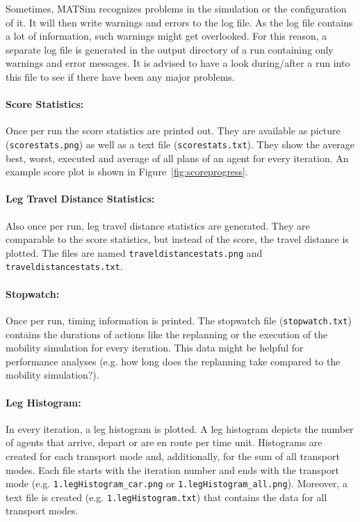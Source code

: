 Sometimes, MATSim recognizes problems in the simulation or the configuration of it. It will then write warnings and errors to the log file. As the log file contains a lot of information, such warnings might get overlooked. For this reason, a separate log file is generated in the output directory of a run containing only warnings and error messages. It is advised to have a look during/after a run into this file to see if there have been any major problems.

\paragraph{Score Statistics:}
Once per run the score statistics are printed out. They are available as picture (\lstinline|scorestats.png|) as well as a text file (\lstinline|scorestats.txt|). They show the average best, worst, executed and average of all plans of an agent for every iteration. An example score plot is shown in Figure~\ref{fig:scoreprogress}.

\paragraph{Leg Travel Distance Statistics:}
Also once per run, leg travel distance statistics are generated. They are comparable to the score statistics, but instead of the score, the travel distance is plotted. The files are named \lstinline|traveldistancestats.png| and \lstinline|traveldistancestats.txt|.

\paragraph{Stopwatch:}
Once per run, timing information is printed. The stopwatch file (\lstinline|stopwatch.txt|) contains the durations of actions like the replanning or the execution of the mobility simulation for every iteration. This data might be helpful for performance analyses (e.g. how long does the replanning take compared to the mobility simulation?).

\paragraph{Leg Histogram:}
In every iteration, a leg histogram is plotted. A leg histogram depicts the number of agents that arrive, depart or are en route per time unit. Histograms are created for each transport mode and, additionally, for the sum of all transport modes. Each file starts with the iteration number and ends with the transport mode (e.g. \lstinline|1.legHistogram_car.png| or \lstinline|1.legHistogram_all.png|). Moreover, a text file is created (e.g. \lstinline|1.legHistogram.txt|) that contains the data for all transport modes.

